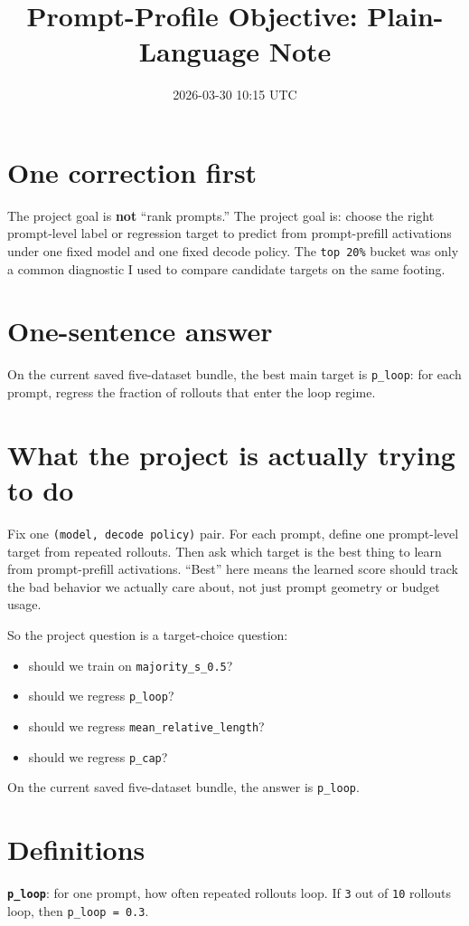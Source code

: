 \documentclass[11pt]{article}
\title{Prompt-Profile Objective: Plain-Language Note}
\author{}
\date{2026-03-30 10:15 UTC}
\begin{document}
\maketitle

\section*{One correction first}
The project goal is \textbf{not} ``rank prompts.'' The project goal is: choose
the right prompt-level label or regression target to predict from
prompt-prefill activations under one fixed model and one fixed decode policy.
The \texttt{top 20\%} bucket was only a common diagnostic I used to compare
candidate targets on the same footing.

\section*{One-sentence answer}
On the current saved five-dataset bundle, the best main target is
\texttt{p\_loop}: for each prompt, regress the fraction of rollouts that enter
the loop regime.

\section*{What the project is actually trying to do}
Fix one \texttt{(model, decode policy)} pair. For each prompt, define one
prompt-level target from repeated rollouts. Then ask which target is the best
thing to learn from prompt-prefill activations. ``Best'' here means the learned
score should track the bad behavior we actually care about, not just prompt
geometry or budget usage.

So the project question is a target-choice question:
\begin{itemize}[leftmargin=1.5em]
\item should we train on \texttt{majority\_s\_0.5}?
\item should we regress \texttt{p\_loop}?
\item should we regress \texttt{mean\_relative\_length}?
\item should we regress \texttt{p\_cap}?
\end{itemize}

On the current saved five-dataset bundle, the answer is \texttt{p\_loop}.

\section*{Definitions}
\textbf{\texttt{p\_loop}}: for one prompt, how often repeated rollouts loop. If
\texttt{3} out of \texttt{10} rollouts loop, then \texttt{p\_loop = 0.3}.
\end{document}

